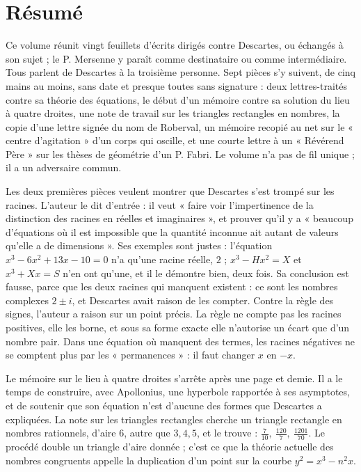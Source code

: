 \documentclass[11pt,a4paper]{article}
\begin{document}
\section*{Résumé}

\begin{resume}
Ce volume réunit vingt feuillets d'écrits dirigés contre Descartes, ou
échangés à son sujet ; le P. Mersenne y paraît comme destinataire ou comme
intermédiaire. Tous parlent de Descartes à la troisième personne. Sept pièces
s'y suivent, de cinq mains au moins, sans date et presque
toutes sans signature : deux lettres-traités contre sa théorie des équations,
le début d'un mémoire contre sa solution du lieu à quatre droites, une note de
travail sur les triangles rectangles en nombres, la copie d'une lettre signée
du nom de Roberval, un mémoire recopié au net sur le « centre d'agitation »
d'un corps qui oscille, et une courte lettre à un « Révérend Père » sur les
thèses de géométrie d'un P. Fabri. Le volume n'a pas de fil unique ; il a un
adversaire commun.

Les deux premières pièces veulent montrer que Descartes s'est trompé sur les
racines. L'auteur le dit d'entrée : il veut « faire voir l'impertinence de la
distinction des racines en réelles et imaginaires », et prouver qu'il y a
« beaucoup d'équations où il est impossible que la quantité inconnue ait autant
de valeurs qu'elle a de dimensions ». Ses exemples sont justes : l'équation
\(x^3-6x^2+13x-10=0\) n'a qu'une racine réelle, \(2\) ; \(x^3-Hx^2=X\) et
\(x^3+Xx=S\) n'en ont qu'une, et il le démontre bien, deux fois. Sa conclusion
est fausse, parce que les deux racines qui manquent existent : ce sont les
nombres complexes \(2\pm i\), et Descartes avait raison de les compter. Contre
la règle des signes, l'auteur a raison sur un point précis. La règle ne compte
pas les racines positives, elle les borne, et sous sa forme exacte elle
n'autorise un écart que d'un nombre pair. Dans une équation où manquent des
termes, les racines négatives ne se comptent plus par les
« permanences » : il faut changer \(x\) en \(-x\).

Le mémoire sur le lieu à quatre droites s'arrête après une page et demie. Il a
le temps de construire, avec Apollonius, une hyperbole rapportée à ses
asymptotes, et de soutenir que son équation n'est d'aucune des formes que
Descartes a expliquées. La note sur les triangles rectangles cherche un
triangle rectangle en nombres rationnels, d'aire 6, autre que \(3,4,5\), et le
trouve : \(\tfrac{7}{10},\ \tfrac{120}{7},\ \tfrac{1201}{70}\). Le procédé
double un triangle d'aire donnée ; c'est ce que la théorie actuelle des nombres
congruents appelle la duplication d'un point sur la courbe
\(y^2=x^3-n^2x\).


\end{resume}
\end{document}
